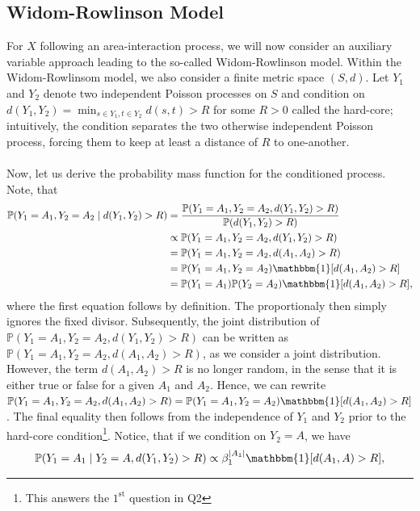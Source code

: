 \documentclass{article}
\begin{document}
\subsection*{Widom-Rowlinson Model}
For $X$ following an area-interaction process, we will now consider an auxiliary variable approach leading to the so-called Widom-Rowlinson model. \newline\newline
Within the Widom-Rowlinsom model, we also consider a finite metric space $(S,d)$. Let $Y_1$ and $Y_2$ denote two independent Poisson processes on $S$ and condition on $d(Y_1, Y_2) = \min_{s \in Y_1, t \in Y_2} d(s,t) > R$ for some $R > 0$ called the hard-core; intuitively, the condition separates the two otherwise independent Poisson process, forcing them to keep at least a distance of $R$ to one-another. \\\\
Now, let us derive the probability mass function for the conditioned process. Note, that 
\begin{align*}
    \mathbb{P}(Y_1 = A_1, Y_2 = A_2 \mid d(Y_1, Y_2) > R) &= \frac{\mathbb{P}(Y_1 = A_1, Y_2 = A_2, d(Y_1, Y_2) > R)}{\mathbb{P}(d(Y_1, Y_2) > R)}\\
    &\propto \mathbb{P}(Y_1 = A_1, Y_2 = A_2, d(Y_1, Y_2) > R) \\
    &= \mathbb{P}(Y_1 = A_1, Y_2 = A_2, d(A_1, A_2) > R)\\
    &=\mathbb{P}(Y_1 = A_1, Y_2 = A_2)\mathbbm{1}[d(A_1, A_2) > R]\\
    &= \mathbb{P}(Y_1 = A_1) \mathbb{P}(Y_2 = A_2) \mathbbm{1}[d(A_1, A_2) > R],
\end{align*} 
where the first equation follows by definition. The proportionaly then simply ignores the fixed divisor. Subsequently, the joint distribution of $\mathbb{P}(Y_1 = A_1, Y_2 = A_2, d(Y_1, Y_2) > R)$ can be written as $\mathbb{P}(Y_1 = A_1, Y_2 = A_2, d(A_1, A_2) > R)$, as we consider a joint distribution. However, the term $d(A_1, A_2) > R$ is no longer random, in the sense that it is either true or false for a given $A_1$ and $A_2$. Hence, we can rewrite $\mathbb{P}(Y_1 = A_1, Y_2 = A_2, d(A_1, A_2) > R) = \mathbb{P}(Y_1 = A_1, Y_2 = A_2)\mathbbm{1}[d(A_1, A_2) > R]$. The final equality then follows from the independence of $Y_1$ and $Y_2$ prior to the hard-core condition\footnote{This answers the $1^{\mathrm{st}}$ question in Q2}. Notice, that if we condition on $Y_2 = A$, we have  
\begin{align*}
    \mathbb{P}(Y_1 = A_1 \mid Y_2 = A, d(Y_1, Y_2) > R) \propto \beta_1^{|A_1|} \mathbbm{1}[d(A_1, A) > R],
\end{align*}
\end{document}
